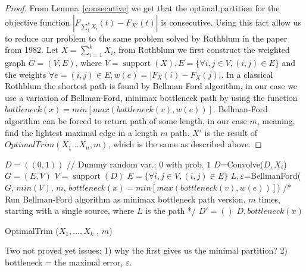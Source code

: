\documentclass[review]{elsarticle}
\DeclareMathOperator{\support}{support}
\begin{document}
\begin{proof}
From Lemma~\ref{consecutive} we get that the optimal partition for the objective function $|F_{\sum_1^k X_i}(t)-F_{X'}(t)|$ is consecutive.
Using this fact allow us to reduce our problem to the same problem solved by Rothblum in the paper from 1982. Let $X = \sum_{i=1}^k X_i$, from Rothblum we first construct the weighted graph $G = (V,E)$, where $V = \support(X), E = \{\forall i,j \in V, (i,j)\in E\}$ and the weights $\forall e=(i,j)\in E, w(e) = |F_{X}(i)-F_{X}(j)|$. In a classical Rothblum the shortest path is found by Bellman Ford algorithm, in our case we use a variation of Bellman-Ford, minimax bottleneck path by using the function $bottleneck(x) =    min   [max(bottleneck(v),w(e))]$. Bellman-Ford algorithm can be forced to return path of some length, in our case $m$, meaning, find the lightest maximal edge in a length $m$ path. 
$X'$ is the result of $OptimalTrim(X_1 \dots X_n,m)$, which is the same as described above. 
\end{proof}

\begin{algorithm}
  \DontPrintSemicolon

   $D=((0,1))$ //  Dummy random var.: $0$ with prob. $1$ \;
   {
	$D$=Convolve($D, X_i$)\; 
	}
   $G=(E,V)$ \;
   $V = \support(D)$\;
   $E = \{\forall i,j \in V, (i,j)\in E\}$\;
   $L, \varepsilon$=BellmanFord($G$, $min(V)$, $m$, $bottleneck(x) =    min   [max(bottleneck(v),w(e))]$) /* Run Bellman-Ford algorithm as minimax bottleneck path version, $m$ times, starting with a single source, where $L$ is the path */ \;
   $D'=()$\;
   \Return $D, bottleneck(x)$\;
     
\caption{OptimalTrim ($X_1,\dots,X_k$ , $m$)}  
\label{alg:sequence}
\end{algorithm}


Two not proved yet issues:
1) why the first gives us the minimal partition? 2) bottleneck  = the maximal error, $\varepsilon$.
\end{document}
